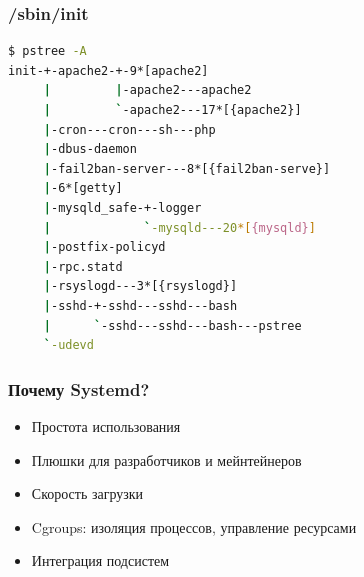 \documentclass[aspectratio=169]{beamer}
\begin{document}
\begin{frame}[fragile]
  \frametitle{/sbin/init}
  
  \begin{lstlisting}[language=sh]
$ pstree -A
init-+-apache2-+-9*[apache2]
     |         |-apache2---apache2
     |         `-apache2---17*[{apache2}]
     |-cron---cron---sh---php
     |-dbus-daemon
     |-fail2ban-server---8*[{fail2ban-serve}]
     |-6*[getty]
     |-mysqld_safe-+-logger
     |             `-mysqld---20*[{mysqld}]
     |-postfix-policyd
     |-rpc.statd
     |-rsyslogd---3*[{rsyslogd}]
     |-sshd-+-sshd---sshd---bash
     |      `-sshd---sshd---bash---pstree
     `-udevd
  \end{lstlisting}

\end{frame}


\begin{frame}
  \frametitle{Почему Systemd?}

  \begin{itemize}
  \item Простота использования
  \item Плюшки для разработчиков и мейнтейнеров
  \item Скорость загрузки
  \item Cgroups: изоляция процессов, управление ресурсами
  \item Интеграция подсистем
  \end{itemize}

\end{frame}
\end{document}
